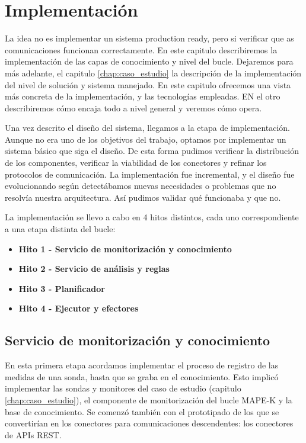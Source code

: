 
\chapter{Implementación}
\label{chap:implementación}

La idea no es implementar un sistema production ready, pero si verificar que as comunicaciones funcionan correctamente. En este capitulo describiremos la implementación de las capas de conocimiento y nivel del bucle. Dejaremos para más adelante, el capitulo \ref{chap:caso_estudio} la descripción de la implementación del nivel de solución y sistema manejado. En este capitulo ofrecemos una vista más concreta de la implementación, y las tecnologías empleadas. EN el otro describiremos cómo encaja todo a nivel general y veremos cómo opera.

Una vez descrito el diseño del sistema, llegamos a la etapa de implementación. Aunque no era uno de los objetivos del trabajo, optamos por implementar un sistema básico que siga el diseño. De esta forma pudimos verificar la distribución de los componentes, verificar la viabilidad de los conectores y refinar los protocolos de comunicación. La implementación fue incremental, y el diseño fue evolucionando según detectábamos nuevas necesidades o problemas que no resolvía nuestra arquitectura. Así pudimos validar qué funcionaba y que no.

La implementación se llevo a cabo en 4 hitos distintos, cada uno correspondiente a una etapa distinta del bucle:
\begin{itemize}
  \item \textbf{Hito 1 - Servicio de monitorización y conocimiento}
  \item \textbf{Hito 2 - Servicio de análisis y reglas}
  \item \textbf{Hito 3 - Planificador}
  \item \textbf{Hito 4 - Ejecutor y efectores}
\end{itemize}

\section{Servicio de monitorización y conocimiento}

En esta primera etapa acordamos implementar el proceso de registro de las medidas de una sonda, hasta que se graba en el conocimiento. Esto implicó implementar las sondas y monitores del caso de estudio (capitulo \ref{chap:caso_estudio}), el componente de monitorización del bucle MAPE-K y la base de conocimiento. Se comenzó también con el prototipado de los que se convertirían en los conectores para comunicaciones descendentes: los conectores de APIs REST.

